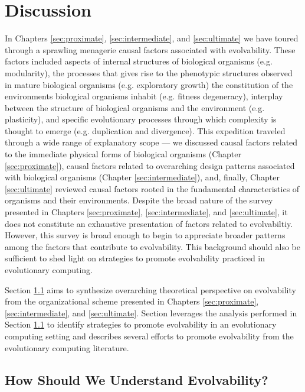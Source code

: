 \chapter{Discussion} \label{sec:discussion}

In Chapters \ref{sec:proximate}, \ref{sec:intermediate}, and \ref{sec:ultimate} we have toured through a sprawling menagerie causal factors associated with evolvability.
These factors included aspects of internal structures of biological organisms (e.g. modularity), the processes that gives rise to the phenotypic structures observed in mature biological organisms (e.g. exploratory growth) the constitution of the environments biological organisms inhabit (e.g. fitness degeneracy), interplay between the structure of biological organisms and the environment (e.g. plasticity), and specific evolutionary processes through which complexity is thought to emerge (e.g. duplication and divergence).
This expedition traveled through a wide range of explanatory scope --- we discussed causal factors related to the immediate physical forms of biological organisms (Chapter \ref{sec:proximate}), causal factors related to overarching design patterns associated with biological organisms (Chapter \ref{sec:intermediate}), and, finally, Chapter \ref{sec:ultimate} reviewed causal factors rooted in the fundamental characteristics of organisms and their environments.
Despite the broad nature of the survey presented in Chapters \ref{sec:proximate}, \ref{sec:intermediate}, and \ref{sec:ultimate}, it does not constitute an exhaustive presentation of factors related to evolvabiltiy.
However, this survey is broad enough to begin to appreciate broader patterns among the factors that contribute to evolvability. 
This background should also be sufficient to shed light on strategies to promote evolvability practiced in evolutionary computing.

Section \ref{sec:how_understand} aims to synthesize overarching theoretical perspective on evolvability from the organizational scheme presented in Chapters \ref{sec:proximate}, \ref{sec:intermediate}, and \ref{sec:ultimate}.
Section \label{sec:how_get} leverages the analysis performed in Section \ref{sec:how_understand} to identify strategies to promote evolvability in an evolutionary computing setting and describes several efforts to promote evolvability from the evolutionary computing literature.


\section{How Should We Understand Evolvability?} \label{sec:how_understand}


